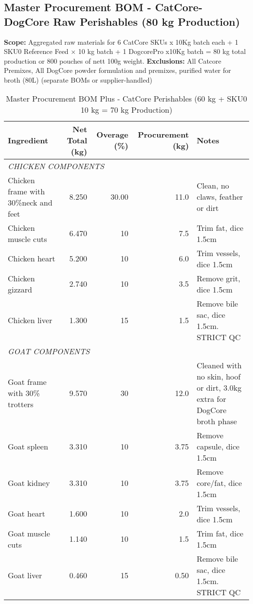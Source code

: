 \subsection*{Master Procurement BOM - CatCore- DogCore Raw Perishables (80 kg Production)}
 
\textbf{Scope:} Aggregated raw materials for 6 CatCore SKUs x 10Kg batch each + 1 SKU0 Reference Feed × 10 kg batch + 1 DogcorePro x10Kg batch = 80 kg total production or 800 pouches of nett 100g weight.
\textbf{Exclusions:} All Catcore Premixes, All DogCore powder formulation and premixes, purified water for broth (80L) (separate BOMs or supplier-handled)\\

\begin{table}[h]
\centering
\caption{Master Procurement BOM Plus - CatCore Perishables (60 kg + SKU0 10 kg = 70 kg Production)}
\begin{tabular}{@{}lrrrp{5cm}@{}}
\toprule
\textbf{Ingredient} & \textbf{Net Total (kg)} & \textbf{Overage (\%)} & \textbf{Procurement (kg)} & \textbf{Notes} \\
\midrule
\multicolumn{5}{l}{\textit{CHICKEN COMPONENTS}} \\
Chicken frame with 30\%neck and feet & 8.250 & 30.00 & 11.0 & Clean, no claws, feather or dirt  \\
Chicken muscle cuts & 6.470 & 10 & 7.5 & Trim fat, dice 1.5cm \\
Chicken heart & 5.200 & 10 & 6.0 & Trim vessels, dice 1.5cm \\
Chicken gizzard & 2.740 & 10 & 3.5 & Remove grit, dice 1.5cm \\
Chicken liver & 1.300 & 15 & 1.5 & Remove bile sac, dice 1.5cm. STRICT QC \\
\midrule
\multicolumn{5}{l}{\textit{GOAT COMPONENTS}} \\
Goat frame with 30\% trotters & 9.570 & 30 & 12.0 & Cleaned with no skin, hoof or dirt, 3.0kg extra for DogCore broth phase \\
Goat spleen & 3.310 & 10 & 3.75 & Remove capsule, dice 1.5cm \\
Goat kidney & 3.310 & 10 & 3.75 & Remove core/fat, dice 1.5cm \\
Goat heart & 1.600 & 10 & 2.0 & Trim vessels, dice 1.5cm \\
Goat muscle cuts & 1.140 & 10 & 1.5 & Trim fat, dice 1.5cm \\
Goat liver & 0.460 & 15 & 0.50 & Remove bile sac, dice 1.5cm. STRICT QC \\

\end{tabular}
\end{table}

